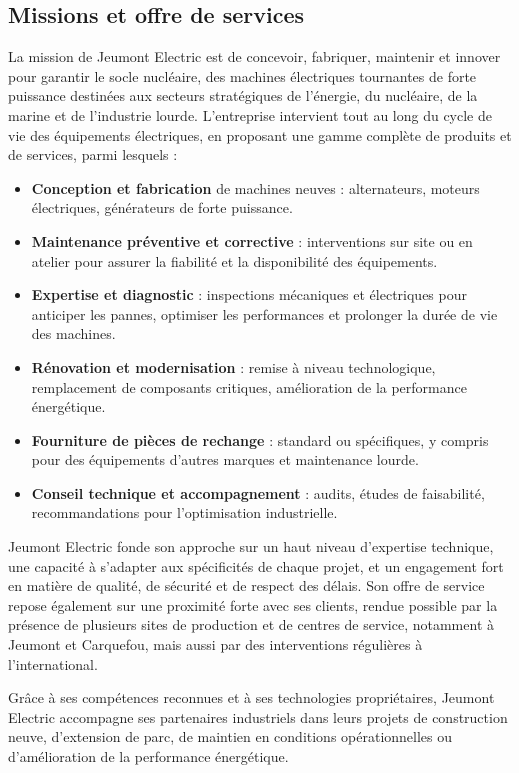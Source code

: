 \documentclass[11pt,a4paper]{article}
\begin{document}
\subsection{Missions et offre de services}

La mission de Jeumont Electric est de concevoir, fabriquer, maintenir et innover pour garantir le socle nucléaire, des machines électriques tournantes de forte puissance destinées aux secteurs stratégiques de l'énergie, du nucléaire, de la marine et de l'industrie lourde.
L'entreprise intervient tout au long du cycle de vie des équipements électriques, en proposant une gamme complète de produits et de services, parmi lesquels :

\begin{itemize}
    \item \textbf{Conception et fabrication} de machines neuves : alternateurs, moteurs électriques, générateurs de forte puissance.
    \item \textbf{Maintenance préventive et corrective} : interventions sur site ou en atelier pour assurer la fiabilité et la disponibilité des équipements.
    \item \textbf{Expertise et diagnostic} : inspections mécaniques et électriques pour anticiper les pannes, optimiser les performances et prolonger la durée de vie des machines.
    \item \textbf{Rénovation et modernisation} : remise à niveau technologique, remplacement de composants critiques, amélioration de la performance énergétique.
    \item \textbf{Fourniture de pièces de rechange} : standard ou spécifiques, y compris pour des équipements d’autres marques et maintenance lourde.
    \item \textbf{Conseil technique et accompagnement} : audits, études de faisabilité, recommandations pour l’optimisation industrielle.
\end{itemize}

Jeumont Electric fonde son approche sur un haut niveau d'expertise technique, une capacité à s'adapter aux spécificités de chaque projet, et un engagement fort en matière de qualité, de sécurité et de respect des délais. Son offre de service repose également sur une proximité forte avec ses clients, rendue possible par la présence de plusieurs sites de production et de centres de service, notamment à Jeumont et Carquefou, mais aussi par des interventions régulières à l'international.

Grâce à ses compétences reconnues et à ses technologies propriétaires, Jeumont Electric
accompagne ses partenaires industriels dans leurs projets de construction neuve, d'extension de
parc, de maintien en conditions opérationnelles ou d'amélioration de la performance énergétique.
\end{document}

